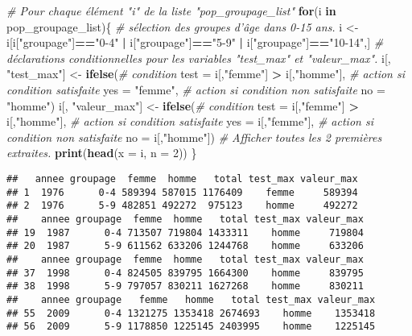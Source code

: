 \documentclass[]{book}
\newenvironment{Shaded}{\begin{snugshade}}{\end{snugshade}}
\newcommand{\KeywordTok}[1]{\textcolor[rgb]{0.13,0.29,0.53}{\textbf{#1}}}
\newcommand{\DataTypeTok}[1]{\textcolor[rgb]{0.13,0.29,0.53}{#1}}
\newcommand{\DecValTok}[1]{\textcolor[rgb]{0.00,0.00,0.81}{#1}}
\newcommand{\StringTok}[1]{\textcolor[rgb]{0.31,0.60,0.02}{#1}}
\newcommand{\CommentTok}[1]{\textcolor[rgb]{0.56,0.35,0.01}{\textit{#1}}}
\newcommand{\ControlFlowTok}[1]{\textcolor[rgb]{0.13,0.29,0.53}{\textbf{#1}}}
\newcommand{\OperatorTok}[1]{\textcolor[rgb]{0.81,0.36,0.00}{\textbf{#1}}}
\newcommand{\NormalTok}[1]{#1}
\begin{document}
\begin{Shaded}
\begin{Highlighting}[]
  \CommentTok{# Pour chaque élément "i" de la liste "pop_groupage_list"}
\ControlFlowTok{for}\NormalTok{(i }\ControlFlowTok{in}\NormalTok{ pop_groupage_list)\{}
  \CommentTok{# sélection des groupes d'âge dans 0-15 ans.}
\NormalTok{  i <-}\StringTok{ }\NormalTok{i[i[}\StringTok{"groupage"}\NormalTok{]}\OperatorTok{==}\StringTok{"0-4"} \OperatorTok{|}\StringTok{ }\NormalTok{i[}\StringTok{"groupage"}\NormalTok{]}\OperatorTok{==}\StringTok{"5-9"} \OperatorTok{|}\StringTok{ }\NormalTok{i[}\StringTok{"groupage"}\NormalTok{]}\OperatorTok{==}\StringTok{"10-14"}\NormalTok{,]}
  \CommentTok{# déclarations conditionnelles pour les variables "test_max" et "valeur_max".}
\NormalTok{  i[, }\StringTok{"test_max"}\NormalTok{] <-}\StringTok{ }\KeywordTok{ifelse}\NormalTok{(}\CommentTok{# condition}
                            \DataTypeTok{test =}\NormalTok{ i[,}\StringTok{"femme"}\NormalTok{] }\OperatorTok{>}\StringTok{ }\NormalTok{i[,}\StringTok{"homme"}\NormalTok{], }
                            \CommentTok{# action si condition satisfaite }
                            \DataTypeTok{yes =} \StringTok{"femme"}\NormalTok{, }
                            \CommentTok{# action si condition non satisfaite}
                            \DataTypeTok{no =} \StringTok{"homme"}\NormalTok{) }
\NormalTok{  i[, }\StringTok{"valeur_max"}\NormalTok{] <-}\StringTok{ }\KeywordTok{ifelse}\NormalTok{(}\CommentTok{# condition}
                              \DataTypeTok{test =}\NormalTok{ i[,}\StringTok{"femme"}\NormalTok{] }\OperatorTok{>}\StringTok{ }\NormalTok{i[,}\StringTok{"homme"}\NormalTok{], }
                              \CommentTok{# action si condition satisfaite }
                              \DataTypeTok{yes =}\NormalTok{ i[,}\StringTok{"femme"}\NormalTok{], }
                              \CommentTok{# action si condition non satisfaite}
                              \DataTypeTok{no =}\NormalTok{ i[,}\StringTok{"homme"}\NormalTok{]) }
  \CommentTok{# Afficher toutes les 2 premières extraites.}
  \KeywordTok{print}\NormalTok{(}\KeywordTok{head}\NormalTok{(}\DataTypeTok{x =}\NormalTok{ i, }\DataTypeTok{n =} \DecValTok{2}\NormalTok{)) }
\NormalTok{\}}
\end{Highlighting}
\end{Shaded}

\begin{verbatim}
##   annee groupage  femme  homme   total test_max valeur_max
## 1  1976      0-4 589394 587015 1176409    femme     589394
## 2  1976      5-9 482851 492272  975123    homme     492272
##    annee groupage  femme  homme   total test_max valeur_max
## 19  1987      0-4 713507 719804 1433311    homme     719804
## 20  1987      5-9 611562 633206 1244768    homme     633206
##    annee groupage  femme  homme   total test_max valeur_max
## 37  1998      0-4 824505 839795 1664300    homme     839795
## 38  1998      5-9 797057 830211 1627268    homme     830211
##    annee groupage   femme   homme   total test_max valeur_max
## 55  2009      0-4 1321275 1353418 2674693    homme    1353418
## 56  2009      5-9 1178850 1225145 2403995    homme    1225145
\end{verbatim}
\end{document}
